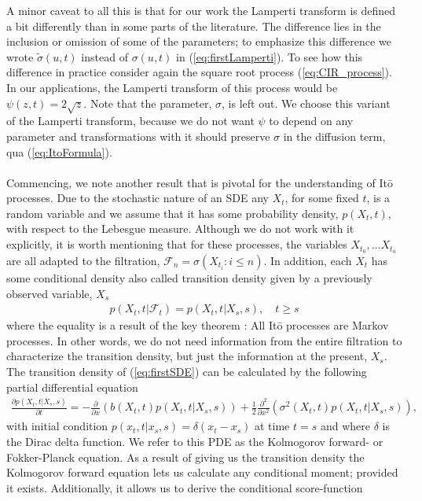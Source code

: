 A minor caveat to all this is that for our work the Lamperti transform is defined a bit differently than in some parts of the literature. The difference lies in the inclusion or omission of some of the parameters; to emphasize this difference we wrote $\tilde{\sigma}(u, t)$ instead of $\sigma(u, t)$ in (\ref{eq:firstLamperti}). To see how this difference in practice consider again the square root process (\ref{eq:CIR_process}). In our applications, the Lamperti transform of this process would be $\psi(z,t) = 2\sqrt{z}$. Note that the parameter, $\sigma$, is left out. We choose this variant of the Lamperti transform, because we do not want $\psi$ to depend on any parameter and transformations with it should preserve $\sigma$ in the diffusion term, qua (\ref{eq:ItoFormula}).\\\\
Commencing, we note another result that is pivotal for the understanding of Itō processes. Due to the stochastic nature of an SDE any $X_t$, for some fixed $t$, is a random variable and we assume that it has some probability density, $p(X_t, t)$, with respect to the Lebesgue measure. Although we do not work with it explicitly, it is worth mentioning that for these processes, the variables $X_{t_0}, \dots X_{t_n}$ are all adapted to the filtration, $\mathcal{F}_n = \sigma\left(X_{t_i}: i \leq n\right)$. In addition, each $X_t$ has some conditional density also called transition density given by a previously observed variable, $X_s$ 
\begin{align}
    p(X_t, t| \mathcal{F}_t) = p(X_t, t | X_s, s), \quad t\geq s
\end{align}
where the equality is a result of the key theorem \cite[theorem 7.1.2]{Oksendal2003_yu}: All Itō processes are Markov processes. In other words, we do not need information from the entire filtration to characterize the transition density, but just the information at the present, $X_s$. The transition density of (\ref{eq:firstSDE}) can be calculated by the following partial differential equation
\begin{align}
    \frac{\partial p(X_t, t | X_s, s)}{\partial t} = -\frac{\partial}{\partial x}\left(b(X_t, t)p(X_t, t | X_s, s)\right) + \frac{1}{2}\frac{\partial^2}{\partial x^2}\left(\sigma^2(X_t, t)p(X_t, t | X_s, s)\right),\label{eq:fokkerPlanck} 
\end{align}
with initial condition $p(x_t, t|x_s, s) = \delta(x_t - x_s)$ at time $t = s$ and where $\delta$ is the Dirac delta function. We refer to this PDE as the Kolmogorov forward- or Fokker-Planck equation. As a result of giving us the transition density the Kolmogorov forward equation lets us calculate any conditional moment; provided it exists. Additionally, it allows us to derive the conditional score-function

